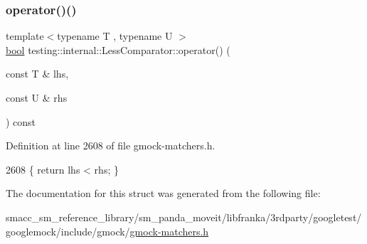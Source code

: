 \subsubsection{\texorpdfstring{operator()()}{operator()()}}
{\footnotesize\ttfamily template$<$typename T , typename U $>$ \\
\hyperlink{classbool}{bool} testing\+::internal\+::\+Less\+Comparator\+::operator() (\begin{DoxyParamCaption}\item[{const T \&}]{lhs,  }\item[{const U \&}]{rhs }\end{DoxyParamCaption}) const\hspace{0.3cm}{\ttfamily [inline]}}



Definition at line 2608 of file gmock-\/matchers.\+h.


\begin{DoxyCode}
2608 \{ \textcolor{keywordflow}{return} lhs < rhs; \}
\end{DoxyCode}


The documentation for this struct was generated from the following file\+:\begin{DoxyCompactItemize}
\item 
smacc\+\_\+sm\+\_\+reference\+\_\+library/sm\+\_\+panda\+\_\+moveit/libfranka/3rdparty/googletest/googlemock/include/gmock/\hyperlink{gmock-matchers_8h}{gmock-\/matchers.\+h}\end{DoxyCompactItemize}
